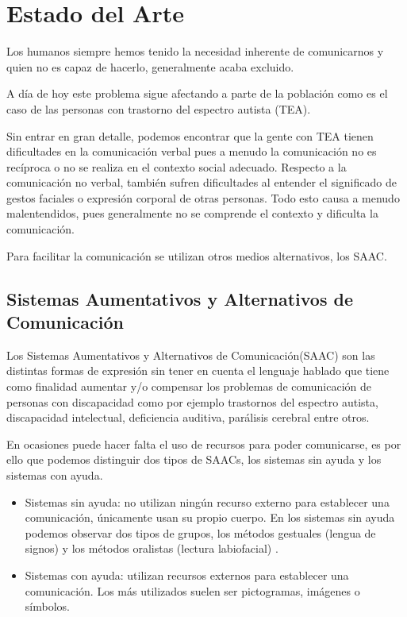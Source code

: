 \chapter{Estado del Arte}
\label{cap:estadoDeLaCuestion}

Los humanos siempre  hemos tenido la necesidad inherente de comunicarnos y quien no es capaz de hacerlo, generalmente acaba excluido.

A día de hoy este problema sigue afectando a parte de la población como es el caso de las personas con trastorno del espectro autista (TEA).

Sin entrar en gran detalle, podemos encontrar que la gente con TEA tienen dificultades en la comunicación verbal pues a menudo la comunicación no es recíproca o no se realiza en el contexto social adecuado. Respecto a la comunicación no verbal, también sufren dificultades al entender el significado de gestos faciales o expresión corporal de otras personas. Todo esto causa a menudo malentendidos, pues generalmente no se comprende el contexto y dificulta la comunicación. 

Para facilitar la comunicación se utilizan otros medios alternativos, los SAAC.

\section{Sistemas Aumentativos y Alternativos de Comunicación}
Los Sistemas Aumentativos y Alternativos de Comunicación(SAAC) son las distintas formas de expresión sin tener en cuenta el lenguaje hablado que tiene como finalidad aumentar y/o compensar los problemas de comunicación de personas con discapacidad como por ejemplo trastornos del espectro autista, discapacidad intelectual, deficiencia auditiva, parálisis cerebral entre otros.

En ocasiones puede hacer falta el uso de recursos para poder comunicarse, es por ello que podemos distinguir dos tipos de SAACs, los sistemas sin ayuda y los sistemas con ayuda.
\newpage
\begin{itemize}
	\item Sistemas sin ayuda: no utilizan ningún recurso externo para establecer una comunicación, únicamente usan su propio cuerpo. En los sistemas sin ayuda podemos observar dos tipos de grupos, los métodos gestuales (lengua de signos) y los métodos oralistas (lectura labiofacial) . 
	\item Sistemas con ayuda: utilizan recursos externos para establecer una comunicación. Los más utilizados suelen ser pictogramas, imágenes o símbolos.
\end{itemize}

